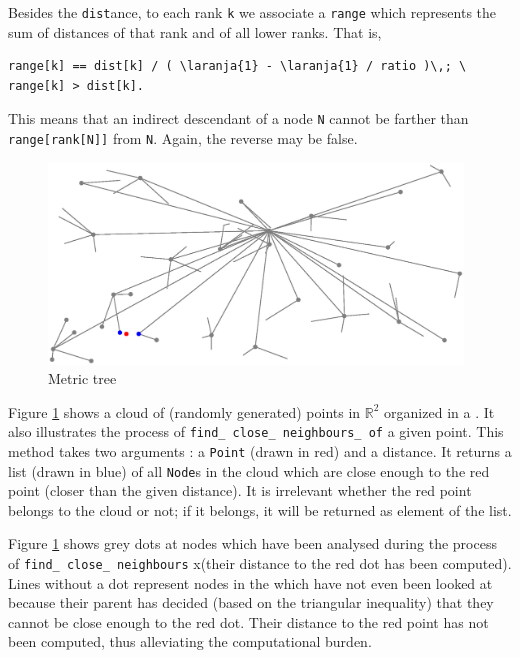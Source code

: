 Besides the {\small\tt dist}ance, to each rank {\small\tt k} we associate a {\small\tt range}
which represents the sum of distances of that rank and of all lower ranks.
That is,
\begin{Verbatim}[commandchars=\\\{\},formatcom=\small\tt,baselinestretch=0.94]
   range[k] == dist[k] / ( \laranja{1} - \laranja{1} / ratio )\,; \ range[k] > dist[k].
\end{Verbatim}
\noindent This means that an indirect descendant of a node {\small\tt N} cannot be farther than
{\small\tt range[rank[N]]} from {\small\tt N}.
Again, the reverse may be false.

\begin{figure}[ht] \centering
  \includegraphics[width=110mm]{metric-tree}
  \caption{Metric tree}
  \label{\numb section 11.\numb fig 3}
\end{figure}

Figure \ref{\numb section 11.\numb fig 3} shows a cloud of (randomly generated) points in
$ \mathbb{R}^2 $ organized in a {\small\tt{}}.
It also illustrates the process of {\small\tt find\_\,close\_\,neighbours\_\,of} a given point.
This method takes two arguments : a {\small\tt Point} (drawn in red) and a distance.
It returns a list (drawn in blue) of all {\small\tt Node}s in the cloud which are close enough
to the red point (closer than the given distance).
It is irrelevant whether the red point belongs to the cloud or not;
if it belongs, it will be returned as element of the list.

Figure \ref{\numb section 11.\numb fig 3} shows grey dots at nodes which have been analysed
during the process of {\small\tt find\_\,close\_\,neighbours}
x(their distance to the red dot has been computed).
Lines without a dot represent nodes in the {\small\tt{}} which have not even been
looked at because their parent has decided (based on the triangular inequality)
that they cannot be close enough to the red dot.
Their distance to the red point has not been computed, thus alleviating the computational
burden.


